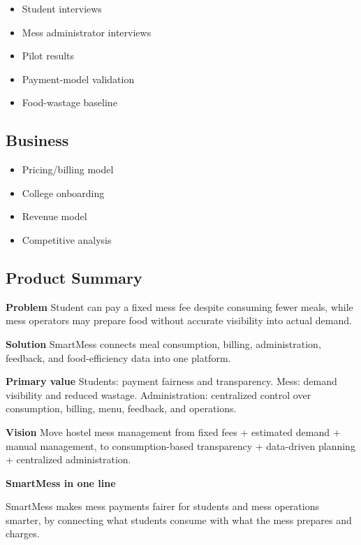 \documentclass[12pt,a4paper]{article}
\begin{document}
\begin{itemize}
    \item Student interviews
    \item Mess administrator interviews
    \item Pilot results
    \item Payment-model validation
    \item Food-wastage baseline
\end{itemize}

\subsection*{Business}

\begin{itemize}
    \item Pricing/billing model
    \item College onboarding
    \item Revenue model
    \item Competitive analysis
\end{itemize}

\subsection*{Product Summary}

\textbf{Problem} Student can pay a fixed mess fee despite consuming fewer
meals, while mess operators may prepare food without accurate visibility into
actual demand.

\textbf{Solution} SmartMess connects meal consumption, billing, administration,
feedback, and food-efficiency data into one platform.

\textbf{Primary value} Students: payment fairness and transparency. Mess:
demand visibility and reduced wastage. Administration: centralized control over
consumption, billing, menu, feedback, and operations.

\textbf{Vision} Move hostel mess management from fixed fees + estimated demand +
manual management, to consumption-based transparency + data-driven planning +
centralized administration.

\textbf{SmartMess in one line}

SmartMess makes mess payments fairer for students and mess operations smarter,
by connecting what students consume with what the mess prepares and charges.
\end{document}
